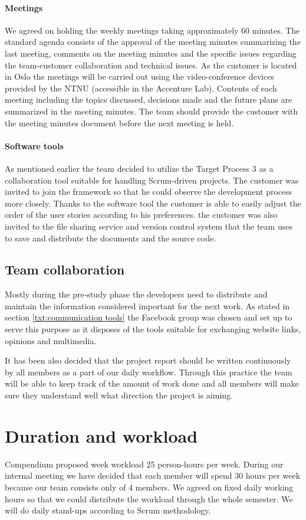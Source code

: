 \paragraph{Meetings}
We agreed on holding the weekly meetings taking approximately 60 minutes. The standard agenda consists of the approval of the meeting minutes summarizing the last meeting, comments on the meeting minutes and the specific issues regarding the team-customer collaboration and technical issues. As the customer is located in Oslo the meetings will be carried out using the video-conference devices provided by the NTNU (accessible in the Accenture Lab). Contents of each meeting including the topics discussed, decisions made and the future plans are summarized in the meeting minutes. The team should provide the customer with the meeting minutes document before the next meeting is held.

\paragraph{Software tools}
As mentioned earlier the team decided to utilize the Target Process 3 as a collaboration tool suitable for handling Scrum-driven projects. The customer was invited to join the framework so that he could observe the development process more closely. Thanks to the software tool the customer is able to easily adjust the order of the user stories according to his preferences. the customer was also invited to the file sharing service and version control system that the team uses to save and distribute the documents and the source code.

\subsection{Team collaboration}
Mostly during the pre-study phase the developers need to distribute and maintain the information considered important for the next work. As stated in section \ref{txt:communication tools} the Facebook group was chosen and set up to serve this purpose as it disposes of the tools suitable for exchanging website links, opinions and multimedia.

It has been also decided that the project report should be written continuously by all members as a part of our daily workflow. Through this practice the team will be able to keep track of the amount of work done and all members will make sure they understand well what direction the project is aiming.

\section{Duration and workload}
 Compendium proposed week workload 25 person-hours per week. During our internal meeting we have decided that each member will spend 30 hours per week because our team consists only of 4 members. We agreed on fixed daily working hours so that we could distribute the workload through the whole semester. We will do daily stand-ups according to Scrum methodology.

